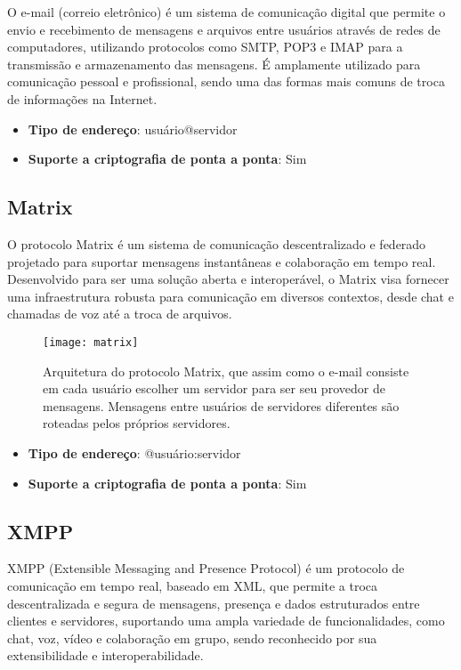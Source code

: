 O e-mail (correio eletrônico) é um sistema de comunicação digital que permite o envio e recebimento de mensagens e arquivos entre usuários através de redes de computadores, utilizando protocolos como SMTP, POP3 e IMAP para a transmissão e armazenamento das mensagens. É amplamente utilizado para comunicação pessoal e profissional, sendo uma das formas mais comuns de troca de informações na Internet. \cite{rfc5321}

\begin{itemize}
  \item \textbf{Tipo de endereço}: usuário@servidor
  \item \textbf{Suporte a criptografia de ponta a ponta}: Sim
\end{itemize}

\subsection{Matrix}

O protocolo Matrix é um sistema de comunicação descentralizado e federado projetado para suportar mensagens instantâneas e colaboração em tempo real. Desenvolvido para ser uma solução aberta e interoperável, o Matrix visa fornecer uma infraestrutura robusta para comunicação em diversos contextos, desde chat e chamadas de voz até a troca de arquivos. \cite{matrixspec}

\begin{figure}
  \centering
  \texttt{[image: matrix]}

  \caption{Arquitetura do protocolo Matrix, que assim como o e-mail consiste em cada usuário escolher um servidor para ser seu provedor de mensagens. Mensagens entre usuários de servidores diferentes são roteadas pelos próprios servidores. \cite{matrixspec}}
\end{figure}

\begin{itemize}
  \item \textbf{Tipo de endereço}: @usuário:servidor
  \item \textbf{Suporte a criptografia de ponta a ponta}: Sim
\end{itemize}

\subsection{XMPP}

XMPP (Extensible Messaging and Presence Protocol) é um protocolo de comunicação em tempo real, baseado em XML, que permite a troca descentralizada e segura de mensagens, presença e dados estruturados entre clientes e servidores, suportando uma ampla variedade de funcionalidades, como chat, voz, vídeo e colaboração em grupo, sendo reconhecido por sua extensibilidade e interoperabilidade. \cite{xmppspec}

